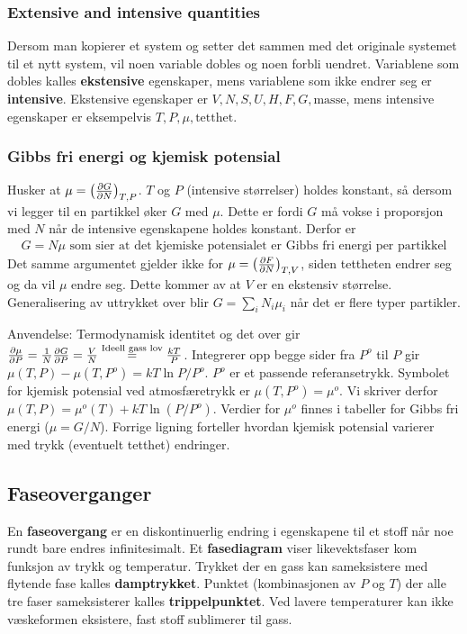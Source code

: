 \documentclass[12pt]{article}
\begin{document}
\subsubsection{Extensive and intensive quantities}
Dersom man kopierer et system og setter det sammen med det originale systemet til
et nytt system, vil noen variable dobles og noen forbli uendret. Variablene som dobles
kalles \textbf{ekstensive} egenskaper, mens variablene som ikke endrer seg er \textbf{intensive}.
Ekstensive egenskaper er $V, N, S, U, H, F, G, \text{masse}$, mens intensive egenskaper er eksempelvis
$T, P, \mu, \text{tetthet}$.
\subsubsection{Gibbs fri energi og kjemisk potensial}
Husker at $\mu = \left(\pdv{G}{N}\right)_{T,P}$. $T$ og $P$ (intensive størrelser) holdes
konstant, så dersom vi legger til en partikkel øker $G$ med $\mu$. Dette er fordi $G$ må
vokse i proporsjon med $N$ når de intensive egenskapene holdes konstant. Derfor er
\begin{align*}
  G = N \mu \text{ som sier at det kjemiske potensialet er Gibbs fri energi per partikkel}
\end{align*}
Det samme argumentet gjelder ikke for $\mu = \left(\pdv{F}{N}\right)_{T,V}$, siden
tettheten endrer seg og da vil $\mu$ endre seg. Dette kommer av at $V$ er en ekstensiv størrelse.
Generalisering av uttrykket over blir $G = \sum_i N_i \mu_i$ når det er flere typer partikler.

Anvendelse: Termodynamisk identitet og det over gir $\pdv{\mu}{P} = \frac{1}{N} \pdv{G}{P} = \frac{V}{N} \overset{\text{Ideell gass lov}}{=} \frac{kT}{P}$.
Integrerer opp begge sider fra $P^o$ til $P$ gir $\mu(T,P) - \mu(T, P^o) = kT\ln{P/P^o}$. $P^o$ er et passende referansetrykk. Symbolet for
kjemisk potensial ved atmosfæretrykk er $\mu(T,P^o) = \mu^o$. Vi skriver derfor $\mu(T,P) = \mu^o(T) + kT \ln{(P/P^o)}$.
Verdier for $\mu^o$ finnes i tabeller for Gibbs fri energi ($\mu = G/N$). Forrige ligning forteller
hvordan kjemisk potensial varierer med trykk (eventuelt tetthet) endringer.
\subsection{Faseoverganger}
En \textbf{faseovergang} er en diskontinuerlig endring i egenskapene til et stoff
når noe rundt bare endres infinitesimalt. Et \textbf{fasediagram} viser likevektsfaser
kom funksjon av trykk og temperatur. Trykket der en gass kan sameksistere med flytende
fase kalles \textbf{damptrykket}. Punktet (kombinasjonen av $P$ og $T$) der
alle tre faser sameksisterer kalles \textbf{trippelpunktet}. Ved lavere temperaturer
kan ikke væskeformen eksistere, fast stoff sublimerer til gass.
\end{document}
